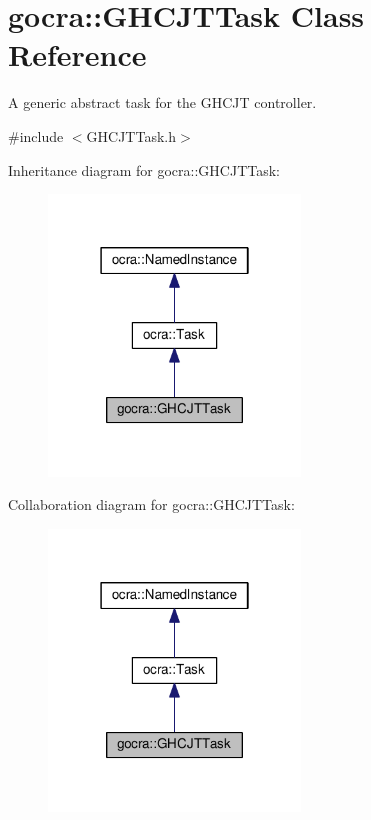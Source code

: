 \hypertarget{classgocra_1_1GHCJTTask}{}\section{gocra\+:\+:G\+H\+C\+J\+T\+Task Class Reference}
\label{classgocra_1_1GHCJTTask}


A generic abstract task for the G\+H\+C\+JT controller.  




{\ttfamily \#include $<$G\+H\+C\+J\+T\+Task.\+h$>$}



Inheritance diagram for gocra\+:\+:G\+H\+C\+J\+T\+Task\+:
\nopagebreak
\begin{figure}[H]
\begin{center}
\leavevmode
\includegraphics[width=190pt]{d8/df9/classgocra_1_1GHCJTTask__inherit__graph}
\end{center}
\end{figure}


Collaboration diagram for gocra\+:\+:G\+H\+C\+J\+T\+Task\+:
\nopagebreak
\begin{figure}[H]
\begin{center}
\leavevmode
\includegraphics[width=190pt]{db/da9/classgocra_1_1GHCJTTask__coll__graph}
\end{center}
\end{figure}
